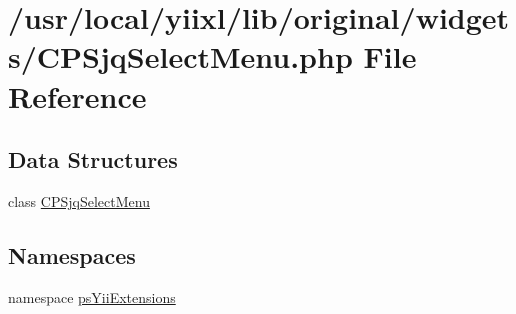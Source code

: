 \hypertarget{CPSjqSelectMenu_8php}{
\section{/usr/local/yiixl/lib/original/widgets/CPSjqSelectMenu.php File Reference}
\label{CPSjqSelectMenu_8php}
}
\subsection*{Data Structures}
\begin{DoxyCompactItemize}
\item 
class \hyperlink{classCPSjqSelectMenu}{CPSjqSelectMenu}
\end{DoxyCompactItemize}
\subsection*{Namespaces}
\begin{DoxyCompactItemize}
\item 
namespace \hyperlink{namespacepsYiiExtensions}{psYiiExtensions}
\end{DoxyCompactItemize}
